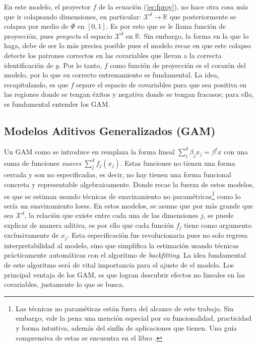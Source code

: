 \documentclass[../Main/Main.tex]{subfiles}
\begin{document}
En este modelo, el proyector $f$ de la ecuación (\ref{ec:fproy}), no hace otra cosa más que ir colapsando dimensiones, en particular: $\mathcal{X}^d \rightarrow \mathbb{R}$ que posteriormente se colapsa por medio de $\Phi$ en $[0,1]$. Es por esto que se le llama función de proyección, pues \textit{proyecta} el espacio $\mathcal{X}^d$ en $\mathbb{R}$. Sin embargo, la forma en la que lo haga, debe de ser lo más precisa posible pues el modelo recae en que este colapso detecte los patrones correctos en las covariables que llevan a la correcta identificación de $y$. Por lo tanto, $f$ como función de proyección es el corazón del modelo, por lo que su correcto entrenamiento es fundamental. La idea, recapitulando, es que $f$ separe el espacio de covariables para que sea positiva en las regiones donde se tengan éxitos y negativa donde se tengan fracasos; para ello, es fundamental entender los GAM.\\

\subsection{Modelos Aditivos Generalizados (GAM)} \label{sec:GAM}
Un GAM como se introduce en \autocite{hastie1986generalized} remplaza la forma lineal $\sum_{1}^d\beta_jx_j = \beta^tx$ con una suma de funciones \textit{suaves} $\sum_j^d f_j(x_j)$. Estas funciones no tienen una forma cerrada y son no especificadas, es decir, no hay tienen una forma funcional concreta y representable algebraicamente. Donde recae la fuerza de estos modelos, es que se estiman usando técnicas de suavizamiento no paramétricas\footnote{Las técnicas no paraméticas están fuera del alcance de este trabajo. Sin embargo, vale la pena una mención especial por su funcionalidad, practicidad y forma intuitiva, además del sinfín de aplicaciones que tienen. Una guía comprensiva de estas se encuentra en el libro \autocite{wasserman2007all}.} como lo sería un suavizamiento loess. En estos modelos, se asume que por más grande que sea $\mathcal{X}^d$, la relación que existe entre cada una de las dimensiones $j$, se puede explicar de manera aditiva, es por ello que cada función $f_j$ tiene como argumento exclusivamente de $x_j$. Esta especificación fue revolucionaria pues no solo regresa interpretabilidad al modelo, sino que simplifica la estimación usando técnicas prácticamente automáticas con el algoritmo de \textit{backfitting}. La idea fundamental de este algoritmo será de vital importancia para el ajuste de el modelo. Los principal ventaja de los GAM, es que logran descubrir efectos no lineales en las covariables, justamente lo que se busca. \\
\end{document}
